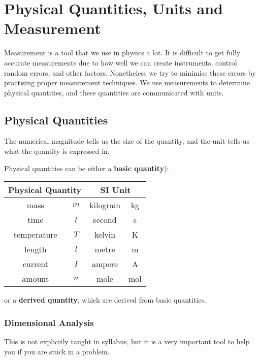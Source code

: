 \documentclass[../main.tex]{subfiles}
\begin{document}
	\section{Physical Quantities, Units and Measurement}
		\begin{preamb}
		Measurement is a tool that we use in physics a lot. It is difficult to get fully accurate measurements due to how well we can create instruments, control random errors, and other factors. Nonetheless we try to minimise these errors by practising proper measurement techniques. We use measurements to determine physical quantities, and these quantities are communicated with units.
		\end{preamb}
			
		\subsection{Physical Quantities}
		
		The numerical magnitude tells us the size of the quantity, and the unit tells us what the quantity is expressed in.
		
		Physical quantities can be either a \textbf{basic quantity}):
		\begin{center}
			\begin{tabular}{cccc}
				\hline \hline
				\multicolumn{2}{c}{Physical Quantity} & \multicolumn{2}{c}{SI Unit} \\
				\hline 
				mass & $m$ & kilogram & kg \\
				time & $t$ & second & s \\
				temperature & $T$ & kelvin & K \\
				length & $l$ & metre & m \\
				current & $I$ & ampere & A \\
				amount & $n$ & mole & mol \\
				\hline \hline
			\end{tabular}
		\end{center}
		or a \textbf{derived quantity}, which are derived from basic quantities. 
		
			\subsubsection{Dimensional Analysis}
			This is not explicitly taught in syllabus, but it is a very important tool to help you if you are stuck in a problem. 
			
\end{document}
